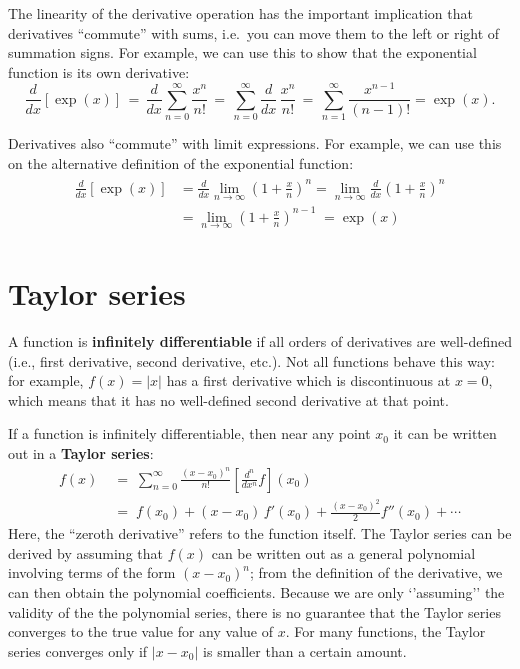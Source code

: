 \documentclass[10pt,a4paper]{article}
\begin{document}
The linearity of the derivative operation has the important
implication that derivatives ``commute'' with sums, i.e.~you can move
them to the left or right of summation signs. For example, we can use
this to show that the exponential function is its own derivative:
\begin{equation}
  \frac{d}{dx} \left[\exp(x)\right] \,=\,
  \frac{d}{dx} \sum_{n=0}^\infty\frac{x^n}{n!}
  \,=\, \sum_{n=0}^\infty\frac{d}{dx} \, \frac{x^n}{n!} \,=\,
  \sum_{n=1}^\infty \frac{x^{n-1}}{(n-1)!} =\exp(x).
\end{equation}

Derivatives also ``commute'' with limit expressions. For example, we
can use this on the alternative definition of the exponential
function:
\begin{align}
  \begin{aligned}
  \frac{d}{dx} \left[\exp(x)\right] &= \frac{d}{dx} \lim_{n\rightarrow\infty} \left(1+\frac{x}{n}\right)^n = \lim_{n\rightarrow\infty} \frac{d}{dx} \left(1+\frac{x}{n}\right)^n \\ &= \lim_{n\rightarrow\infty} \left(1+\frac{x}{n}\right)^{n-1} \;= \exp(x)
  \end{aligned}
\end{align}

\section{Taylor series}
\label{taylor-series}

A function is \textbf{infinitely differentiable} if all orders of
derivatives are well-defined (i.e., first derivative, second derivative,
etc.). Not all functions behave this way: for example, $f(x) = |x|$
has a first derivative which is discontinuous at $x = 0$, which means
that it has no well-defined second derivative at that point.

If a function is infinitely differentiable, then near any point $x_0$
it can be written out in a \textbf{Taylor series}:
\begin{align}
  f(x) \;&=\; \sum_{n=0}^\infty \frac{(x-x_0)^n}{n!} \left[\frac{d^n}{dx^n} f\right](x_0) \\&=\; f(x_0) + (x-x_0)\, f'(x_0) + \frac{(x-x_0)^2}{2} f''(x_0) + \cdots
\end{align}
Here, the ``zeroth derivative'' refers to the function itself. The
Taylor series can be derived by assuming that $f(x)$ can be written
out as a general polynomial involving terms of the form $(x-x_0)^n$;
from the definition of the derivative, we can then obtain the
polynomial coefficients. Because we are only `'assuming'' the validity
of the the polynomial series, there is no guarantee that the Taylor
series converges to the true value for any value of $x$. For many
functions, the Taylor series converges only if $|x-x_0|$ is smaller
than a certain amount.
\end{document}

